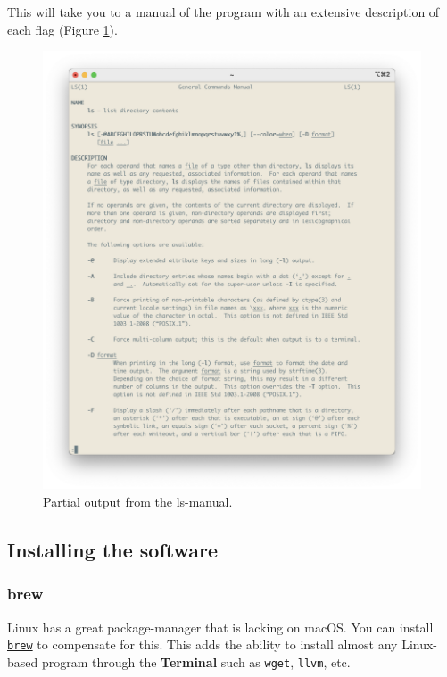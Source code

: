 \documentclass[
]{book}
\newcommand{\passthrough}[1]{#1}
\begin{document}
This will take you to a manual of the program with an extensive description of each flag (Figure \ref{fig:ls-manual}).

\begin{figure}[H]

{\centering \includegraphics[width=22.64in]{img/ls_manual} 

}

\caption{Partial output from the ls-manual.}\label{fig:ls-manual}
\end{figure}

\hypertarget{installing-the-software}{%
\subsection{Installing the software}\label{installing-the-software}}

\hypertarget{brew}{%
\subsubsection{brew}\label{brew}}

Linux has a great package-manager that is lacking on macOS. You can install \href{https://brew.sh}{\passthrough{\lstinline!brew!}} to compensate for this. This adds the ability to install almost any Linux-based program through the \textbf{Terminal} such as \passthrough{\lstinline!wget!}, \passthrough{\lstinline!llvm!}, etc.
\end{document}
